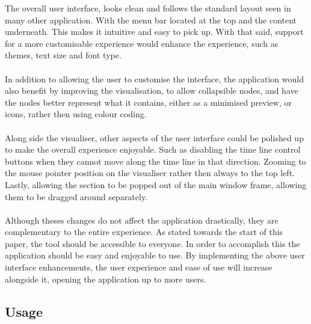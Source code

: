 The overall user interface, looks clean and follows the standard layout seen in many other application. With the menu bar located at the top and the content underneath. This makes it intuitive and easy to pick up. With that said, support for a more customisable experience would enhance the experience, such as themes, text size and font type.
\\\\
In addition to allowing the user to customise the interface, the application would also benefit by improving the visualisation, to allow collapsible nodes, and have the nodes better represent what it contains, either as a minimised preview, or icons, rather then using colour coding.
\\\\
Along side the visualiser, other aspects of the user interface could be polished up to make the overall experience enjoyable. Such as disabling the time line control buttons when they cannot move along the time line in that direction. Zooming to the mouse pointer position on the visualiser rather then always to the top left. Lastly, allowing the section to be popped out of the main window frame, allowing them to be dragged around separately. 
\\\\
Although theses changes do not affect the application drastically, they are complementary to the entire experience. As stated towards the start of this paper, the tool should be accessible to everyone. In order to accomplish this the application should be easy and enjoyable to use. By implementing the above user interface enhancements, the user experience and ease of use will increase alongside it, opening the application up to more users.
 
\subsection{Usage}
\label{subsec:usage_eval}

